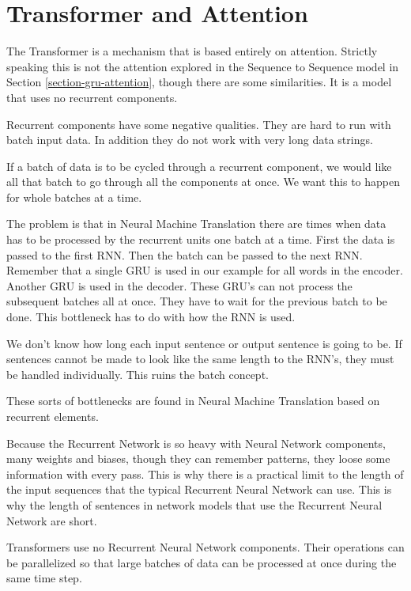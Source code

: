 
\section{Transformer and Attention}

\label{transformer-intro}

The Transformer is a mechanism that is based entirely on attention. Strictly speaking this is not the attention explored in the Sequence to Sequence model in Section \ref{section-gru-attention}, though there are some similarities. It is a model that uses no recurrent components.

Recurrent components have some negative qualities. They are hard to run with batch input data. In addition they do not work with very long data strings. 

If a batch of data is to be cycled through a recurrent component, we would like all that batch to go through all the components at once.  We want this to happen for whole batches at a time.

The problem is that in Neural Machine Translation there are times when data has to be processed by the recurrent units one batch at a time. First the data is passed to the first RNN. Then the batch can be passed to the next RNN. Remember that a single GRU is used in our example for all words in the encoder. Another GRU is used in the decoder. These GRU's can not process the subsequent batches all at once. They have to wait for the previous batch to be done. This bottleneck has to do with how the RNN is used. 

We don't know how long each input sentence or output sentence is going to be. If sentences cannot be made to look like the same length to the RNN's, they must be handled individually. This ruins the batch concept.

These sorts of bottlenecks are found in Neural Machine Translation based on recurrent elements.

Because the Recurrent Network is so heavy with Neural Network components, many weights and biases, though they can remember patterns, they loose some information with every pass. This is why there is a practical limit to the length of the input sequences that the typical Recurrent Neural Network can use. This is why the length of sentences in network models that use the Recurrent Neural Network are short.

Transformers use no Recurrent Neural Network components. Their operations can be parallelized so that large batches of data can be processed at once during the same time step. 

